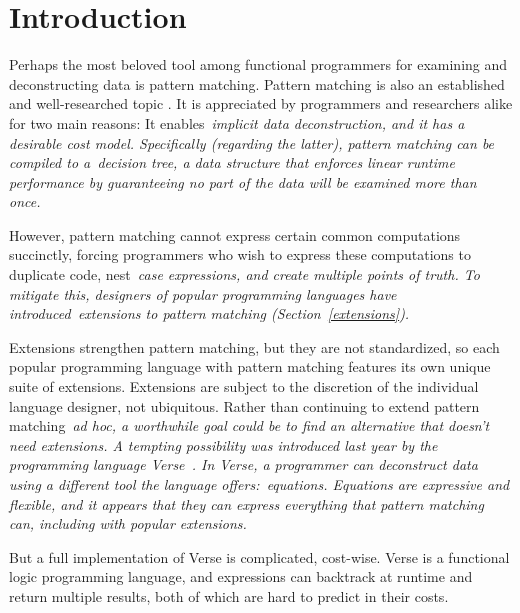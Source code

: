 \documentclass[manuscript,screen 12pt, nonacm]{acmart}
\begin{document}
\section{Introduction}

Perhaps the most beloved tool among functional programmers for examining and
deconstructing data is pattern matching. 
Pattern matching is also an established and well-researched topic
\citep{wadler1987views, macqueen1985tree, burton1993pattern, palao1996new,
maranget, bpc}. It is appreciated by programmers and researchers alike for two
main reasons: It enables~\it{implicit} data deconstruction, and it has a
desirable cost model. Specifically (regarding the latter), pattern matching can
be compiled to a~\it{decision tree}, a data structure that enforces linear
runtime performance by guaranteeing no part of the data will be examined more
than once.~\citep{maranget}

However, pattern matching cannot express certain common computations succinctly,
forcing programmers who wish to express these computations to duplicate code,
nest~\it{case} expressions, and create multiple points of truth. To mitigate
this, designers of popular programming languages have introduced~\it{extensions}
to pattern matching (Section~\ref{extensions}). 

Extensions strengthen pattern matching, but they are not standardized, so each
popular programming language with pattern matching features its own unique suite
of extensions. Extensions are subject to the discretion of the individual
language designer, not ubiquitous. Rather than continuing to extend pattern
matching~\it{ad hoc}, a worthwhile goal could be to find an alternative that
doesn't need extensions. A tempting possibility was introduced last year by the
programming language Verse~\citep{verse}. In Verse, a programmer can deconstruct
data using a different tool the language offers:~\it{equations}. Equations are
expressive and flexible, and it appears that they can express everything that
pattern matching can, including with popular extensions. 

But a full implementation of Verse is complicated, cost-wise. Verse is a
functional logic programming language, and expressions can backtrack at runtime
and return multiple results, both of which are hard to predict in their costs. 

\end{document}
